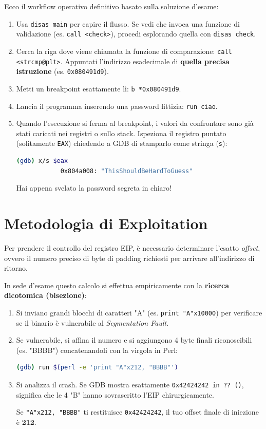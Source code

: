 \documentclass[12pt,a4paper]{report}
\begin{document}
	Ecco il workflow operativo definitivo basato sulla soluzione d'esame:
	\begin{enumerate}
		\item Usa \texttt{disas main} per capire il flusso. Se vedi che invoca una funzione di validazione (es. \texttt{call <check>}), procedi esplorando quella con \texttt{disas check}.
		\item Cerca la riga dove viene chiamata la funzione di comparazione: \texttt{call <strcmp@plt>}. Appuntati l'indirizzo esadecimale di \textbf{quella precisa istruzione} (es. \texttt{0x080491d9}).
		\item Metti un breakpoint esattamente lì: \texttt{b *0x080491d9}.
		\item Lancia il programma inserendo una password fittizia: \texttt{run ciao}.
		\item Quando l'esecuzione si ferma al breakpoint, i valori da confrontare sono già stati caricati nei registri o sullo stack. Ispeziona il registro puntato (solitamente \texttt{EAX}) chiedendo a GDB di stamparlo come stringa (\texttt{s}):
		\begin{lstlisting}[language=bash]
			(gdb) x/s $eax
			0x804a008: "ThisShouldBeHardToGuess"
		\end{lstlisting}
		Hai appena svelato la password segreta in chiaro!
	\end{enumerate}
	
	\section{Metodologia di Exploitation}
	Per prendere il controllo del registro EIP, è necessario determinare l'esatto \textit{offset}, ovvero il numero preciso di byte di padding richiesti per arrivare all'indirizzo di ritorno.
	
	In sede d'esame questo calcolo si effettua empiricamente con la \textbf{ricerca dicotomica (bisezione)}:
	\begin{enumerate}
		\item Si inviano grandi blocchi di caratteri "A" (es. \texttt{print "A"x10000}) per verificare se il binario è vulnerabile al \textit{Segmentation Fault}.
		\item Se vulnerabile, si affina il numero e si aggiungono 4 byte finali riconoscibili (es. "BBBB") concatenandoli con la virgola in Perl:
		\begin{lstlisting}[language=bash]
			(gdb) run $(perl -e 'print "A"x212, "BBBB"')
		\end{lstlisting}
		\item Si analizza il crash. Se GDB mostra esattamente \texttt{0x42424242 in ?? ()}, significa che le 4 "B" hanno sovrascritto l'EIP chirurgicamente. 
		\begin{nota}
			Se \texttt{"A"x212, "BBBB"} ti restituisce \texttt{0x42424242}, il tuo offset finale di iniezione è \textbf{212}.
		\end{nota}
	\end{enumerate}
	
\end{document}
